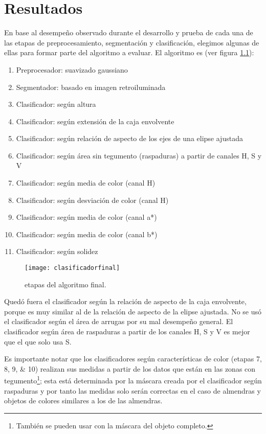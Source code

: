 \chapter{Resultados}

En base al desempeño observado durante el desarrollo y prueba de cada una de las etapas de preprocesamiento, segmentación y clasificación, elegimos algunas de ellas para formar parte del algoritmo a evaluar. El algoritmo es (ver figura \ref{fig:esquemaalgoritmofinal}): 
%
\begin{enumerate}
\item Preprocesador: suavizado gaussiano
\item Segmentador: basado en imagen retroiluminada
\item Clasificador: según altura
\item Clasificador: según extensión de la caja envolvente
\item Clasificador: según relación de aspecto de los ejes de una elipse ajustada
\item Clasificador: según área sin tegumento (raspaduras) a partir de canales H, S y V
\item Clasificador: según media de color (canal H)
\item Clasificador: según desviación de color (canal H)
\item Clasificador: según media de color (canal a*)
\item Clasificador: según media de color (canal b*)
\item Clasificador: según solidez
\end{enumerate}

\begin{figure}[hbtp]
\centering
\texttt{[image: clasificadorfinal]}
\caption[Etapas del algoritmo final]{etapas del algoritmo final.}
\label{fig:esquemaalgoritmofinal}
\end{figure}


Quedó fuera el clasificador según la relación de aspecto de la caja envolvente, porque es muy similar al de la relación de aspecto de la elipse ajustada. No se usó el clasificador según el área de arrugas por su mal desempeño general. El clasificador según área de raspaduras a partir de los canales H, S y V es mejor que el que solo usa S.

Es importante notar que los clasificadores según características de color (etapas \numlist{7;8;9;10}) realizan sus medidas a partir de los datos que están en las zonas con tegumento\footnote{También se pueden usar con la máscara del objeto completo.}; esta está determinada por la máscara creada por el clasificador según raspaduras y por tanto las medidas solo serán correctas en el caso de almendras y objetos de colores similares a los de las almendras.

